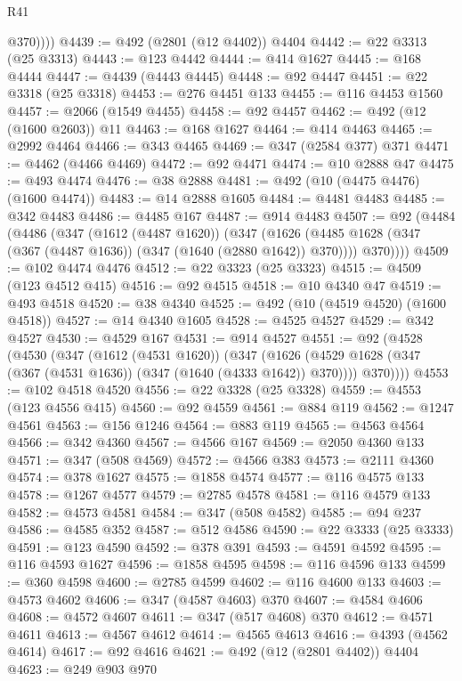 \begin{lexlean}{R41}
\begin{coremodule}
            @370))))
@4439 := @492 (@2801 (@12 @4402)) @4404
@4442 := @22 @3313 (@25 @3313)
@4443 := @123 @4442
@4444 := @414 @1627
@4445 := @168 @4444
@4447 := @4439 (@4443 @4445)
@4448 := @92 @4447
@4451 := @22 @3318 (@25 @3318)
@4453 := @276 @4451 @133
@4455 := @116 @4453 @1560
@4457 := @2066 (@1549 @4455)
@4458 := @92 @4457
@4462 := @492 (@12 (@1600 @2603)) @11
@4463 := @168 @1627
@4464 := @414 @4463
@4465 := @2992 @4464
@4466 := @343 @4465
@4469 := @347 (@2584 @377) @371
@4471 := @4462 (@4466 @4469)
@4472 := @92 @4471
@4474 := @10 @2888 @47
@4475 := @493 @4474
@4476 := @38 @2888
@4481 := @492 (@10 (@4475 @4476) (@1600 @4474))
@4483 := @14 @2888 @1605
@4484 := @4481 @4483
@4485 := @342 @4483
@4486 := @4485 @167
@4487 := @914 @4483
@4507 := @92
    (@4484
      (@4486
        (@347
          (@1612 (@4487 @1620))
          (@347
            (@1626 (@4485 @1628 (@347 (@367 (@4487 @1636)) (@347 (@1640 (@2880 @1642)) @370))))
            @370))))
@4509 := @102 @4474 @4476
@4512 := @22 @3323 (@25 @3323)
@4515 := @4509 (@123 @4512 @415)
@4516 := @92 @4515
@4518 := @10 @4340 @47
@4519 := @493 @4518
@4520 := @38 @4340
@4525 := @492 (@10 (@4519 @4520) (@1600 @4518))
@4527 := @14 @4340 @1605
@4528 := @4525 @4527
@4529 := @342 @4527
@4530 := @4529 @167
@4531 := @914 @4527
@4551 := @92
    (@4528
      (@4530
        (@347
          (@1612 (@4531 @1620))
          (@347
            (@1626 (@4529 @1628 (@347 (@367 (@4531 @1636)) (@347 (@1640 (@4333 @1642)) @370))))
            @370))))
@4553 := @102 @4518 @4520
@4556 := @22 @3328 (@25 @3328)
@4559 := @4553 (@123 @4556 @415)
@4560 := @92 @4559
@4561 := @884 @119
@4562 := @1247 @4561
@4563 := @156 @1246
@4564 := @883 @119
@4565 := @4563 @4564
@4566 := @342 @4360
@4567 := @4566 @167
@4569 := @2050 @4360 @133
@4571 := @347 (@508 @4569)
@4572 := @4566 @383
@4573 := @2111 @4360
@4574 := @378 @1627
@4575 := @1858 @4574
@4577 := @116 @4575 @133
@4578 := @1267 @4577
@4579 := @2785 @4578
@4581 := @116 @4579 @133
@4582 := @4573 @4581
@4584 := @347 (@508 @4582)
@4585 := @94 @237
@4586 := @4585 @352
@4587 := @512 @4586
@4590 := @22 @3333 (@25 @3333)
@4591 := @123 @4590
@4592 := @378 @391
@4593 := @4591 @4592
@4595 := @116 @4593 @1627
@4596 := @1858 @4595
@4598 := @116 @4596 @133
@4599 := @360 @4598
@4600 := @2785 @4599
@4602 := @116 @4600 @133
@4603 := @4573 @4602
@4606 := @347 (@4587 @4603) @370
@4607 := @4584 @4606
@4608 := @4572 @4607
@4611 := @347 (@517 @4608) @370
@4612 := @4571 @4611
@4613 := @4567 @4612
@4614 := @4565 @4613
@4616 := @4393 (@4562 @4614)
@4617 := @92 @4616
@4621 := @492 (@12 (@2801 @4402)) @4404
@4623 := @249 @903 @970

\end{coremodule}
\end{lexlean}
